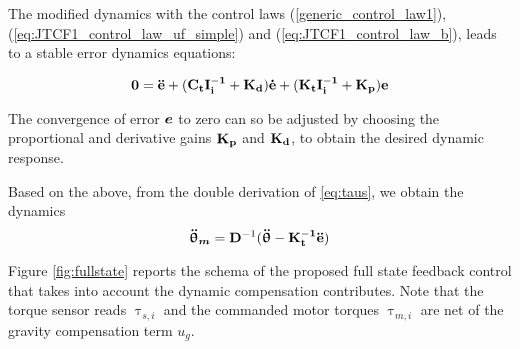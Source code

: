 	The modified dynamics with the control laws  (\ref{generic_control_law1}), (\ref{eq:JTCF1_control_law_uf_simple}) and (\ref{eq:JTCF1_control_law_b}), leads to a stable error dynamics equations:
	
	\begin{equation}
	{ \boldsymbol {0}}  = \mathbf{\ddot{e}} + ( \mathbf{C_t} \mathbf{I_i^{-1}} + \mathbf{K_d} )\mathbf{\dot{e}}+ ( \mathbf{K_t} \mathbf{I_i^{-1}}  + \mathbf{K_p}   )\mathbf{e}
	\end{equation}
	
	The convergence of error ${ \boldsymbol {e}}$ to zero can so be adjusted by choosing the proportional and derivative gains $\mathbf{K_p}$ and $\mathbf{K_d}$, to obtain the desired dynamic response.
	
	
	Based on the above, from the double derivation of \eqref{eq:taus}, we obtain the dynamics
	\begin{equation} 
	\vects{\ddot{\uptheta}_m} = \vectm{D}^{-1} (\vects{\ddot{\uptheta}} -\vectm{K_t^{-1}} \vect{\ddot{e}}) \label{eq:taus_deriv} 
	\end{equation}	
	
	
	\par Figure \ref{fig:fullstate} reports the schema of the proposed full state feedback control that takes into account the dynamic compensation contributes. Note that the torque sensor reads $\uptau_{s,i}$ and the commanded motor torques  $\uptau_{m,i}$ are net of the gravity compensation term $u_g$.
	
